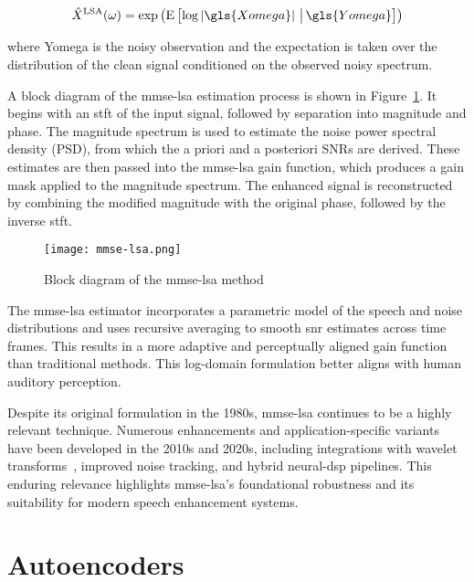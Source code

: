 \begin{equation}
    \hat{X}^{\text{LSA}}(\omega) = \exp \left( \mathrm{E} \left[ \log \left| {\gls{Xomega}} \right| \,\big|\, {\gls{Yomega}} \right] \right)
\end{equation}

where \gls{Yomega} is the noisy observation and the expectation is taken over the distribution of the clean signal conditioned on the observed noisy spectrum.

A block diagram of the \gls{mmse-lsa} estimation process is shown in Figure~\ref{fig:mmse_lsa_block}. It begins with an \gls{stft} of the input signal, followed by separation into magnitude and phase. The magnitude spectrum is used to estimate the noise power spectral density (PSD), from which the a priori and a posteriori SNRs are derived. These estimates are then passed into the \gls{mmse-lsa} gain function, which produces a gain mask applied to the magnitude spectrum. The enhanced signal is reconstructed by combining the modified magnitude with the original phase, followed by the inverse \gls{stft}.

\begin{figure}[H]
    \centering
    \texttt{[image: mmse-lsa.png]}
    \caption{\label{fig:mmse_lsa_block} Block diagram of the \gls{mmse-lsa} method}
\end{figure}

The \gls{mmse-lsa} estimator incorporates a parametric model of the speech and noise distributions and uses recursive averaging to smooth \gls{snr} estimates across time frames. This results in a more adaptive and perceptually aligned gain function than traditional methods. This log-domain formulation better aligns with human auditory perception.

Despite its original formulation in the 1980s, \gls{mmse-lsa} continues to be a highly relevant technique. Numerous enhancements and application-specific variants have been developed in the 2010s and 2020s, including integrations with wavelet transforms~\cite{wei2016mmse}, improved noise tracking, and hybrid neural-\gls{dsp} pipelines. This enduring relevance highlights \gls{mmse-lsa}'s foundational robustness and its suitability for modern speech enhancement systems.

\section{Autoencoders}
\label{sec:autoencoders}

